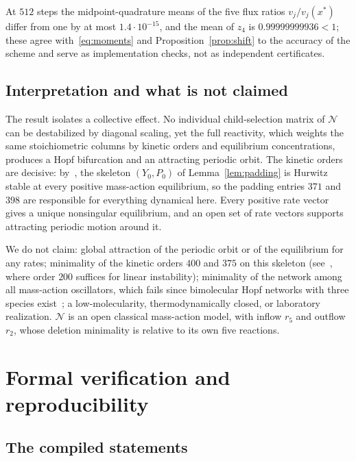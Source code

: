 \documentclass[11pt,a4paper]{article}
\theoremstyle{plain}
\theoremstyle{definition}
\theoremstyle{remark}
\newcommand{\xs}{x^{*}}
\newcommand{\Osc}{\mathcal{N}}
\begin{document}
At $512$ steps the midpoint-quadrature means of the five flux ratios $v_j/v_j(\xs)$ differ from one by at most $1.4\cdot10^{-15}$, and the mean of $z_4$ is $0.99999999936<1$; these agree with~\eqref{eq:moments} and Proposition~\ref{prop:shift} to the accuracy of the scheme and serve as implementation checks, not as independent certificates.

\subsection{Interpretation and what is not claimed}

The result isolates a collective effect. No individual child-selection matrix of $\Osc$ can be destabilized by diagonal scaling, yet the full reactivity, which weights the same stoichiometric columns by kinetic orders and equilibrium concentrations, produces a Hopf bifurcation and an attracting periodic orbit. The kinetic orders are decisive: by~\cite[Theorem~5.2]{KineticOrder2026}, the skeleton $(Y_0,P_0)$ of Lemma~\ref{lem:padding} is Hurwitz stable at every positive mass-action equilibrium, so the padding entries $371$ and $398$ are responsible for everything dynamical here. Every positive rate vector gives a unique nonsingular equilibrium, and an open set of rate vectors supports attracting periodic motion around it.

We do not claim: global attraction of the periodic orbit or of the equilibrium for any rates; minimality of the kinetic orders $400$ and $375$ on this skeleton (see~\cite[Question~8.2]{KineticOrder2026}, where order $200$ suffices for linear instability); minimality of the network among all mass-action oscillators, which fails since bimolecular Hopf networks with three species exist~\cite{BanajiBoros2023}; a low-molecularity, thermodynamically closed, or laboratory realization. $\Osc$ is an open classical mass-action model, with inflow $r_5$ and outflow $r_2$, whose deletion minimality is relative to its own five reactions.

\section{Formal verification and reproducibility}\label{sec:formal}

\subsection{The compiled statements}
\end{document}
